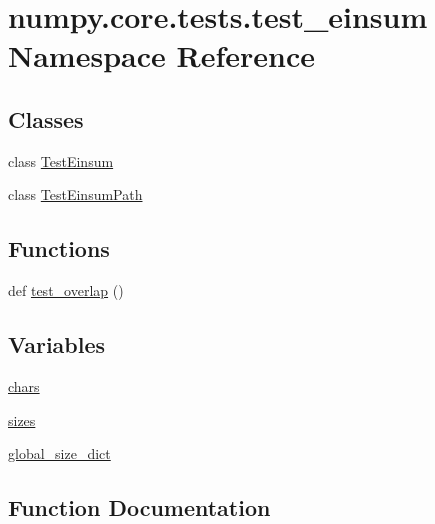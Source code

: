 \hypertarget{namespacenumpy_1_1core_1_1tests_1_1test__einsum}{}\section{numpy.\+core.\+tests.\+test\+\_\+einsum Namespace Reference}
\label{namespacenumpy_1_1core_1_1tests_1_1test__einsum}
\subsection*{Classes}
\begin{DoxyCompactItemize}
\item 
class \hyperlink{classnumpy_1_1core_1_1tests_1_1test__einsum_1_1TestEinsum}{Test\+Einsum}
\item 
class \hyperlink{classnumpy_1_1core_1_1tests_1_1test__einsum_1_1TestEinsumPath}{Test\+Einsum\+Path}
\end{DoxyCompactItemize}
\subsection*{Functions}
\begin{DoxyCompactItemize}
\item 
def \hyperlink{namespacenumpy_1_1core_1_1tests_1_1test__einsum_a2aa3d66bc308832db8568154a7f4c585}{test\+\_\+overlap} ()
\end{DoxyCompactItemize}
\subsection*{Variables}
\begin{DoxyCompactItemize}
\item 
\hyperlink{namespacenumpy_1_1core_1_1tests_1_1test__einsum_a86bd4e503f9fad3ede60e9042b47f698}{chars}
\item 
\hyperlink{namespacenumpy_1_1core_1_1tests_1_1test__einsum_aa4646ecf6c76b4a7e13265003da43f5c}{sizes}
\item 
\hyperlink{namespacenumpy_1_1core_1_1tests_1_1test__einsum_a7987e3439d0eab01bcf675229bf0f787}{global\+\_\+size\+\_\+dict}
\end{DoxyCompactItemize}


\subsection{Function Documentation}
\mbox{\label{namespacenumpy_1_1core_1_1tests_1_1test__einsum_a2aa3d66bc308832db8568154a7f4c585}} 
